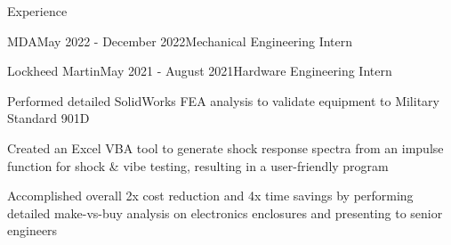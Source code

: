 \documentclass{resume} %
\begin{document}
\begin{rSection}{Experience}
\begin{rSubsection}{MDA}{May 2022 - December 2022}{Mechanical Engineering Intern}{}
\end{rSubsection}

\begin{comment}
\begin{rSubsection}{Co-Lead Propulsion Engineer}{September 2022 - Present}{Queen's Rocket Engineering Team}{}
\item Designing the team's first student-built Hybrid Rocket Engine to reach an apogee of 10,000ft and compete at two international events against 150+ other schools.
\item Writing a Python simulation to numerically model the turbulent boundary layer and fuel regression dynamics, allowing for the prediction and optimization of performance metrics such as thrust, chamber pressure, and specific impulse.
\item Managing a team of 15+ engineering students to accomplish a hot-fire test through efficiently delegating tasks, providing learning resources, and maintaining deadlines while giving members autonomy and ownership of their work.
\item Created Standard Operating Procedures (SOP) documentation in LaTeX for the safe operation of a cold-flow and hot-fire test, complete with hazard assessment, risk mitigation, and contingency planning
\end{rSubsection}
\end{comment}

\begin{rSubsection}{Lockheed Martin}{May 2021 - August 2021}{Hardware Engineering Intern}{}

\item Performed detailed SolidWorks FEA analysis to validate equipment to Military Standard 901D
\item Created an Excel VBA tool to generate shock response spectra from an impulse function for shock \& vibe testing, resulting in a user-friendly program
\item Accomplished overall 2x cost reduction and 4x time savings by performing detailed make-vs-buy analysis on electronics enclosures and presenting to senior engineers

\end{rSubsection}

\begin{comment}
\begin{rSubsection}{Department of National Defense - Engineering Intern}{May 2020 - September 2020}{}{}

\item Documented and presented key specifications on armored patrol vehicles for 411 vehicles in 69 variants
\item Reworked procurement documents based on technical requirements from multiple military bases
\item Proofread english-to-french translations of contracts to ensure correctness


\end{comment}
\end{rSection}
\end{document}

